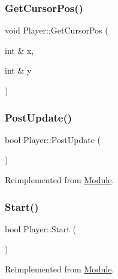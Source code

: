 \mbox{\label{class_player_a67b4cc05008c0b3ec4c40ce2987698a0}} 
\subsubsection{\texorpdfstring{GetCursorPos()}{GetCursorPos()}}
{\footnotesize\ttfamily void Player\+::\+Get\+Cursor\+Pos (\begin{DoxyParamCaption}\item[{int \&}]{x,  }\item[{int \&}]{y }\end{DoxyParamCaption})}

\mbox{\label{class_player_a1defee0e5f5a011305ae00d3a022af18}} 
\subsubsection{\texorpdfstring{PostUpdate()}{PostUpdate()}}
{\footnotesize\ttfamily bool Player\+::\+Post\+Update (\begin{DoxyParamCaption}{ }\end{DoxyParamCaption})\hspace{0.3cm}{\ttfamily [virtual]}}



Reimplemented from \mbox{\hyperlink{class_module_afc355df351a4483850c3f512823ceebd}{Module}}.

\mbox{\label{class_player_a797198656a642b66fd8ec656153d8595}} 
\subsubsection{\texorpdfstring{Start()}{Start()}}
{\footnotesize\ttfamily bool Player\+::\+Start (\begin{DoxyParamCaption}{ }\end{DoxyParamCaption})\hspace{0.3cm}{\ttfamily [virtual]}}



Reimplemented from \mbox{\hyperlink{class_module_aaf67046743296e8de310039a1dc95d86}{Module}}.

